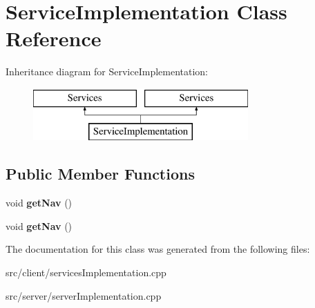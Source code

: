 \hypertarget{class_service_implementation}{}\section{Service\+Implementation Class Reference}
\label{class_service_implementation}
Inheritance diagram for Service\+Implementation\+:\begin{figure}[H]
\begin{center}
\leavevmode
\includegraphics[height=2.000000cm]{class_service_implementation}
\end{center}
\end{figure}
\subsection*{Public Member Functions}
\begin{DoxyCompactItemize}
\item 
void {\bfseries get\+Nav} ()\hypertarget{class_service_implementation_a8bdcc77581d536e52dce63004f96d6c5}{}\label{class_service_implementation_a8bdcc77581d536e52dce63004f96d6c5}

\item 
void {\bfseries get\+Nav} ()\hypertarget{class_service_implementation_a8bdcc77581d536e52dce63004f96d6c5}{}\label{class_service_implementation_a8bdcc77581d536e52dce63004f96d6c5}

\end{DoxyCompactItemize}


The documentation for this class was generated from the following files\+:\begin{DoxyCompactItemize}
\item 
src/client/services\+Implementation.\+cpp\item 
src/server/server\+Implementation.\+cpp\end{DoxyCompactItemize}
